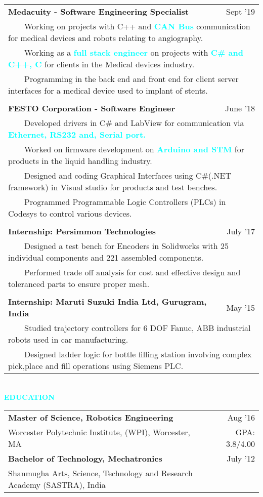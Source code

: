 \documentclass[10.9pt,letter]{article}
\newcommand{\tabitem}{~~\llap{\textbullet}~~}
\newcommand{\aquaText}[1]{\textcolor{aqua}{\textbf{#1}}}
\newcommand{\para}{\\[.5\baselineskip]}
\newcommand{\newBull}[1]{\multicolumn{2}{l}{\tabitem #1}\\}
\newcommand{\newSeg}[3]{\textbf{#1} & {#2}\textemdash{#3}\\}
\begin{document}
\begin{tabular}{p{} r}
  \newSeg{Medacuity - Software Engineering Specialist}{Sept '19}{Present}
        \newBull{Working on projects with C++ and \aquaText{CAN Bus} communication for medical devices and robots relating to angiography.}
        \newBull{Working as a \aquaText{full stack engineer} on projects with \aquaText{C\# and C++, C} for clients in the Medical devices industry.}
        \newBull{Programming in the back end and front end for client server interfaces for a medical device used to implant of stents. }\\
  \newSeg{FESTO Corporation - Software Engineer}{June '18}{Sept '19}
         \newBull{Developed drivers in C\# and LabView for communication via \aquaText{Ethernet, RS232 and, Serial port.}}
         \newBull{Worked on firmware development on \aquaText{Arduino and STM} for products in the liquid handling industry.}
         \newBull{Designed and coding Graphical Interfaces using C\#(.NET framework) in Visual studio for products and test benches.}
         \newBull{Programmed Programmable Logic Controllers (PLCs) in Codesys to control various devices.}\\
    \newSeg{Internship: Persimmon Technologies}{July '17}{Aug '17}
         \newBull{Designed a test bench for Encoders in Solidworks with 25 individual components and 221 assembled components.}
         \newBull{Performed trade off analysis for cost and effective design and toleranced parts to ensure proper mesh.}\\
    \newSeg{Internship: Maruti Suzuki India Ltd, Gurugram, India}{May '15}{Jun '15}
         \newBull{Studied trajectory controllers for 6 DOF Fanuc, ABB industrial robots used in car manufacturing.}
         \newBull{Designed ladder logic for bottle filling station involving complex pick,place and fill operations using Siemens PLC.}
\end{tabular}\para
\aquaText{EDUCATION}\para
\begin{tabular}{p{} r}
    \newSeg{Master of Science, Robotics Engineering}{Aug '16}{May '18}
        Worcester Polytechnic Institute, (WPI), Worcester, MA & GPA: 3.8/4.00 \\[1ex]
    \newSeg{Bachelor of Technology, Mechatronics}{July '12}{May '16}
        Shanmugha Arts, Science, Technology  and Research Academy (SASTRA), India
\end{tabular}\para
\end{document}
